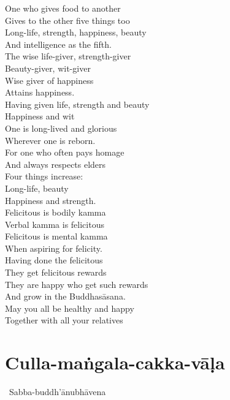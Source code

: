 \begin{english-verses}
  One who gives food to another\\
  Gives to the other five things too\\
  Long-life, strength, happiness, beauty\\
  And intelligence as the fifth.\\
  The wise life-giver, strength-giver\\
  Beauty-giver, wit-giver\\
  Wise giver of happiness\\
  Attains happiness.\\
  Having given life, strength and beauty\\
  Happiness and wit\\
  One is long-lived and glorious\\
  Wherever one is reborn.\\
  For one who often pays homage\\
  And always respects elders\\
  Four things increase:\\
  Long-life, beauty\\
  Happiness and strength.\\
  Felicitous is bodily kamma\\
  Verbal kamma is felicitous\\
  Felicitous is mental kamma\\
  When aspiring for felicity.\\
  Having done the felicitous\\
  They get felicitous rewards\\
  They are happy who get such rewards\\
  And grow in the Buddhasāsana.\\
  May you all be healthy and happy\\
  Together with all your relatives
\end{english-verses}

\suttaRef{[AN 5.37 / Dhp 109 / AN 3.155]}

\section{Culla-maṅgala-cakka-vāḷa}
\label{culla-mangala-cakka-vala}


\begin{leader-only}
  \anglebracketleft\ \hspace{-0.5mm}Sabba-buddh'ānubhāvena \hspace{-0.5mm}\anglebracketright\
\end{leader-only}


